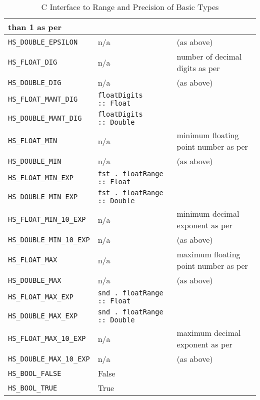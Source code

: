 \documentclass[a4paper,twoside]{article}
\newcommand{\code}[1]{\texttt{#1}}      %
\begin{document}
\begin{table}
\begin{center}
\begin{tabular}{|l|l|p{30ex}|}
      than 1 as per~\cite{C99}\\
      \hline
      \code{HS\_DOUBLE\_EPSILON} & n/a
      & (as above)\\
      \hline
      \code{HS\_FLOAT\_DIG} & n/a
      & number of decimal digits as per~\cite{C99}\\
      \hline
      \code{HS\_DOUBLE\_DIG} & n/a
      & (as above)\\
      \hline
      \code{HS\_FLOAT\_MANT\_DIG} & \code{floatDigits ::\ Float}
      & \\
      \hline
      \code{HS\_DOUBLE\_MANT\_DIG} & \code{floatDigits ::\ Double}
      & \\
      \hline
      \code{HS\_FLOAT\_MIN} & n/a
      & minimum floating point number as per~\cite{C99}\\
      \hline
      \code{HS\_DOUBLE\_MIN} & n/a
      & (as above)\\
      \hline
      \code{HS\_FLOAT\_MIN\_EXP} & \code{fst .\ floatRange ::\ Float}
      & \\
      \hline
      \code{HS\_DOUBLE\_MIN\_EXP} & \code{fst .\ floatRange ::\ Double}
      & \\
      \hline
      \code{HS\_FLOAT\_MIN\_10\_EXP} & n/a
      & minimum decimal exponent as per~\cite{C99}\\
      \hline
      \code{HS\_DOUBLE\_MIN\_10\_EXP} & n/a
      & (as above)\\
      \hline
      \code{HS\_FLOAT\_MAX} & n/a
      & maximum floating point number as per~\cite{C99}\\
      \hline
      \code{HS\_DOUBLE\_MAX} & n/a
      & (as above)\\
      \hline
      \code{HS\_FLOAT\_MAX\_EXP} & \code{snd .\ floatRange ::\ Float}
      & \\
      \hline
      \code{HS\_DOUBLE\_MAX\_EXP} & \code{snd .\ floatRange ::\ Double}
      & \\
      \hline
      \code{HS\_FLOAT\_MAX\_10\_EXP} & n/a
      & maximum decimal exponent as per~\cite{C99}\\
      \hline
      \code{HS\_DOUBLE\_MAX\_10\_EXP} & n/a
      & (as above)\\
      \hline
      \code{HS\_BOOL\_FALSE} & False
      & \\
      \hline
      \code{HS\_BOOL\_TRUE} & True
      & \\
      \hline
    \end{tabular}
    \caption{C Interface to Range and Precision of Basic Types}
    \label{tab:c-haskell-values}
  \end{center}
\end{table}
\end{document}
